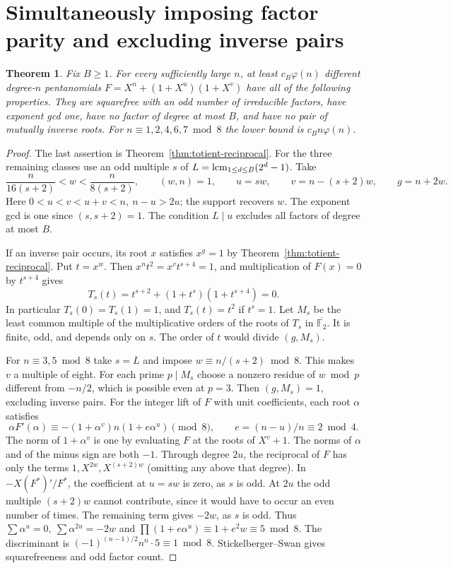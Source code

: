 \documentclass[11pt]{article}
\newtheorem{theorem}{Theorem}
\newcommand{\F}{\mathbb F_2}
\begin{document}
\section{Simultaneously imposing factor parity and excluding inverse pairs}\label{sec:joint-sieve}

\begin{theorem}\label{thm:joint-sieve}
Fix \(B\ge1\). For every sufficiently large \(n\), at least
\(c_B\varphi(n)\) different degree-\(n\) pentanomials
\(F=X^n+(1+X^u)(1+X^v)\) have all of the following properties.
They are squarefree with an odd number of irreducible factors, have
exponent gcd one, have no factor of degree at most \(B\), and have
no pair of mutually inverse roots. For \(n\equiv1,2,4,6,7\bmod8\)
the lower bound is \(c_B n\varphi(n)\).
\end{theorem}
\begin{proof}
The last assertion is Theorem~\ref{thm:totient-reciprocal}.
For the three remaining classes use an odd multiple \(s\) of
\(L=\mathop{\rm lcm}_{1\le d\le B}(2^d-1)\). Take
\[
 \frac{n}{16(s+2)}<w<\frac{n}{8(s+2)},\qquad
 (w,n)=1,\qquad u=sw,\qquad v=n-(s+2)w,\qquad g=n+2w .
\]
Here \(0<u<v<u+v<n,\ n-u>2u\); the support recovers \(w\).
The exponent gcd is one since \((s,s+2)=1\).
The condition \(L\mid u\) excludes all factors of degree at most \(B\).

If an inverse pair occurs, its root \(x\) satisfies \(x^g=1\) by
Theorem~\ref{thm:totient-reciprocal}. Put \(t=x^w\). Then
\(x^nt^2=x^vt^{s+4}=1\), and multiplication of \(F(x)=0\)
by \(t^{s+4}\) gives
\[
 T_s(t)=t^{s+2}+(1+t^s)(1+t^{s+4})=0 .
\]
In particular \(T_s(0)=T_s(1)=1\), and \(T_s(t)=t^2\) if \(t^s=1\).
Let \(M_s\) be the least common multiple of the multiplicative
orders of the roots of \(T_s\) in \(\overline{\F}\).
It is finite, odd, and depends only on \(s\). The order of \(t\)
would divide \((g,M_s)\).

For \(n\equiv3,5\bmod8\) take \(s=L\) and impose
\(w\equiv n/(s+2)\bmod8\). This makes \(v\) a multiple of eight.
For each prime \(p\mid M_s\) choose a nonzero residue of \(w\bmod p\)
different from \(-n/2\), which is possible even at \(p=3\).
Then \((g,M_s)=1\), excluding inverse pairs. For the integer lift of
\(F\) with unit coefficients, each root \(\alpha\) satisfies
\[
 \alpha F'(\alpha)\equiv
 -(1+\alpha^v)n(1+e\alpha^u)\pmod8,\qquad e=(n-u)/n\equiv2\bmod4 .
\]
The norm of \(1+\alpha^v\) is one by evaluating \(F\) at the roots
of \(X^v+1\). The norms of \(\alpha\) and of the minus sign are both
\(-1\). Through degree \(2u\), the reciprocal of \(F\) has only the
terms \(1,X^{2w},X^{(s+2)w}\) (omitting any above that degree).
In \(-X(F^*)'/F^*\), the coefficient at \(u=sw\) is zero, as
\(s\) is odd. At \(2u\) the odd multiple \((s+2)w\) cannot
contribute, since it would have to occur an even number of times.
The remaining term gives \(-2w\), as \(s\) is odd.
Thus \(\sum\alpha^u=0,\ \sum\alpha^{2u}=-2w\) and
\(\prod(1+e\alpha^u)\equiv1+e^2w\equiv5\bmod8\).
The discriminant is
\((-1)^{(n-1)/2}n^n\cdot5\equiv1\bmod8\).
Stickelberger--Swan gives squarefreeness and odd factor count.


\end{proof}
\end{document}
